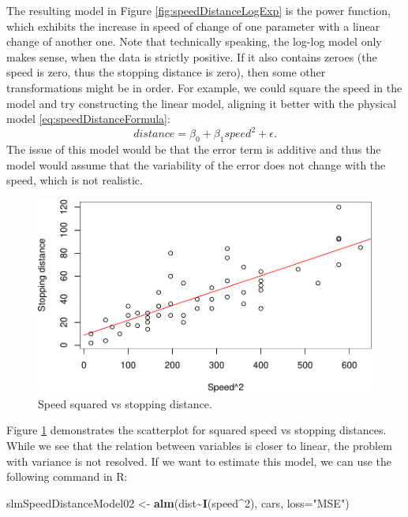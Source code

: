 \documentclass[
]{book}
\newenvironment{Shaded}{\begin{snugshade}}{\end{snugshade}}
\newcommand{\DataTypeTok}[1]{\textcolor[rgb]{0.13,0.29,0.53}{#1}}
\newcommand{\DecValTok}[1]{\textcolor[rgb]{0.00,0.00,0.81}{#1}}
\newcommand{\KeywordTok}[1]{\textcolor[rgb]{0.13,0.29,0.53}{\textbf{#1}}}
\newcommand{\NormalTok}[1]{#1}
\newcommand{\OperatorTok}[1]{\textcolor[rgb]{0.81,0.36,0.00}{\textbf{#1}}}
\newcommand{\StringTok}[1]{\textcolor[rgb]{0.31,0.60,0.02}{#1}}
\theoremstyle{definition}
\theoremstyle{definition}
\theoremstyle{definition}
\theoremstyle{definition}
\theoremstyle{remark}
\begin{document}
The resulting model in Figure \ref{fig:speedDistanceLogExp} is the power function, which exhibits the increase in speed of change of one parameter with a linear change of another one. Note that technically speaking, the log-log model only makes sense, when the data is strictly positive. If it also contains zeroes (the speed is zero, thus the stopping distance is zero), then some other transformations might be in order. For example, we could square the speed in the model and try constructing the linear model, aligning it better with the physical model \eqref{eq:speedDistanceFormula}:
\begin{equation}
    distance = \beta_0 + \beta_1 speed^2 + \epsilon .
    \label{eq:speedDistanceModelSquare}
\end{equation}
The issue of this model would be that the error term is additive and thus the model would assume that the variability of the error does not change with the speed, which is not realistic.

\begin{figure}
\centering
\includegraphics{Svetunkov---Statistics-for-Business-Analytics_files/figure-latex/speedDistanceSquare-1.pdf}
\caption{\label{fig:speedDistanceSquare}Speed squared vs stopping distance.}
\end{figure}

Figure \ref{fig:speedDistanceSquare} demonstrates the scatterplot for squared speed vs stopping distances. While we see that the relation between variables is closer to linear, the problem with variance is not resolved. If we want to estimate this model, we can use the following command in R:

\begin{Shaded}
\begin{Highlighting}[]
\NormalTok{slmSpeedDistanceModel02 \textless{}{-}}\StringTok{ }\KeywordTok{alm}\NormalTok{(dist}\OperatorTok{\textasciitilde{}}\KeywordTok{I}\NormalTok{(speed}\OperatorTok{\^{}}\DecValTok{2}\NormalTok{), cars, }\DataTypeTok{loss=}\StringTok{"MSE"}\NormalTok{)}
\end{Highlighting}
\end{Shaded}
\end{document}
